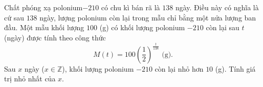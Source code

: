 \begin{ex}%
	Chất phóng xạ polonium$-210$ có chu kì bán rã là $138$ ngày. Điều này có nghĩa là cứ sau $138$ ngày, lượng polonium còn lại trong mẫu chỉ bằng một nửa lượng ban đầu.	
	Một mẫu khối lượng $100$ (g) có khối lượng polonium $- 210$ còn lại sau $t$ (ngày) được tính theo công thức
	$$M(t) = 100 \left(\frac{1}{2}\right)^{\frac{t}{138}} \text{ (g)}.$$
	Sau $x$ ngày ($x \in \mathbb{Z}$), khối lượng polonium $- 210$ còn lại nhỏ hơn $10$ (g). Tính giá trị nhỏ nhất của $x$.
\end{ex}

